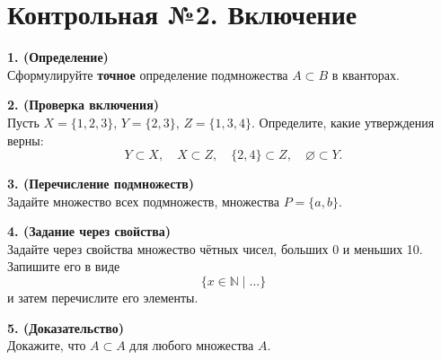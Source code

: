 \documentclass[12pt]{article}
\begin{document}
\section{Контрольная №2. Включение}
\textbf{1. (Определение)}\\
Сформулируйте \textbf{точное} определение подмножества $A \subset B$ в кванторах.

\medskip
\textbf{2. (Проверка включения)}\\
Пусть $X = \{1,2,3\}$, $Y = \{2,3\}$, $Z = \{1,3,4\}$.
Определите, какие утверждения верны:
\[
Y \subset X,\quad
X \subset Z,\quad
\{2,4\} \subset Z,\quad
\varnothing \subset Y.
\]

\medskip
\textbf{3. (Перечисление подмножеств)}\\
Задайте множество всех подмножеств, множества $P=\{a,b\}$.

\medskip
\textbf{4. (Задание через свойства)}\\
Задайте через свойства множество чётных чисел, больших 0 и меньших 10.  
Запишите его в виде
\[
\{x\in\mathbb{N}\mid \dots\}
\]
и затем перечислите его элементы.

\medskip
\textbf{5. (Доказательство)}\\
Докажите, что $A \subset A$ для любого множества $A$.
\end{document}
